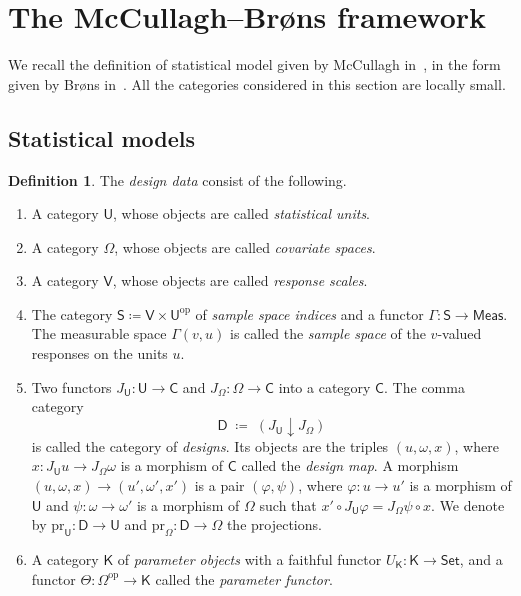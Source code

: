 \documentclass[11pt,a4paper]{article}
\theoremstyle{plain}
\theoremstyle{definition}
\newtheorem{definition}[theorem]{Definition}
\theoremstyle{remark}
\newcommand{\cat}[1]{\mathsf{#1}}
\newcommand{\catU}{\cat{U}}
\newcommand{\catV}{\cat{V}}
\newcommand{\catO}{\cat{\Omega}}
\newcommand{\catS}{\cat{S}}
\newcommand{\catD}{\cat{D}}
\newcommand{\catK}{\cat{K}}
\newcommand{\Meas}{\cat{Meas}}
\newcommand{\Set}{\cat{Set}}
\newcommand{\op}{\mathrm{op}}
\newcommand{\pr}{\mathrm{pr}}
\begin{document}
\section{The McCullagh--Br\o ns framework}\label{sec:mcb}

We recall the definition of statistical model given by McCullagh
in~\cite{mccullagh_what_2002}, in the form given by Br\o ns
in~\cite{brons_discussion_2002}. All the categories considered in this section
are locally small.

\subsection{Statistical models}

\begin{definition}\label{def:designdata}
The \emph{design data} consist of the following.
\begin{enumerate}
\item A category $\catU$, whose objects are called \emph{statistical units}.
\item A category $\catO$, whose objects are called \emph{covariate spaces}.
\item A category $\catV$, whose objects are called \emph{response scales}.
\item The category $\catS \coloneqq \catV \times \catU^{\op}$ of \emph{sample
space indices} and a functor $\Gamma \colon \catS \to \Meas$. The measurable
space $\Gamma(v,u)$ is called the \emph{sample space} of the $v$-valued
responses on the units $u$.
\item Two functors $J_{\catU} \colon \catU \to \cat{C}$ and
$J_{\catO} \colon \catO \to \cat{C}$ into a category $\cat{C}$. The comma
category
\[
\catD \;\coloneqq\; (J_{\catU} \downarrow J_{\catO})
\]
is called the category of \emph{designs}. Its objects are the triples
$(u,\omega,x)$, where $x \colon J_\catU u \to J_\catO \omega$ is a morphism of
$\cat{C}$ called the \emph{design map}. A morphism
$(u,\omega,x) \to (u',\omega',x')$ is a pair $(\varphi,\psi)$, where
$\varphi \colon u \to u'$ is a morphism of $\catU$ and
$\psi \colon \omega \to \omega'$ is a morphism of $\catO$ such that
$x' \circ J_{\catU}\varphi = J_{\catO}\psi \circ x$. We denote by
$\pr_{\catU} \colon \catD \to \catU$ and $\pr_{\catO} \colon \catD \to \catO$
the projections.
\item A category $\catK$ of \emph{parameter objects} with a faithful functor
$U_{\catK} \colon \catK \to \Set$, and a functor
$\Theta \colon \catO^{\op} \to \catK$ called the \emph{parameter functor}.
\end{enumerate}
\end{definition}
\end{document}
